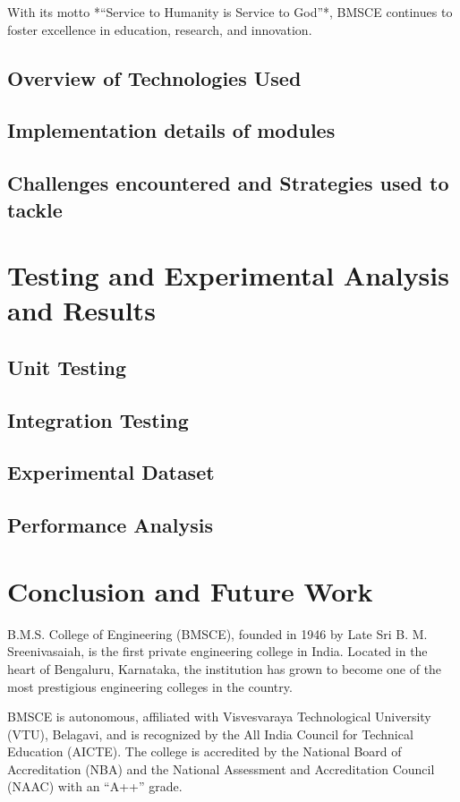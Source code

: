 \documentclass[12pt,a4paper]{report}
\begin{document}
With its motto *“Service to Humanity is Service to God”*, BMSCE continues to foster 
excellence in education, research, and innovation.
\section{Overview of Technologies Used}
\section{Implementation details of modules}
\section{Challenges encountered and Strategies used to tackle}
\chapter{Testing and Experimental Analysis and Results}
\section{ Unit Testing}
\section{Integration Testing}
\section{Experimental Dataset}
\section{Performance Analysis}
	

\chapter{Conclusion and Future Work}
B.M.S. College of Engineering (BMSCE), founded in 1946 by Late Sri B. M. Sreenivasaiah, 
is the first private engineering college in India. Located in the heart of Bengaluru, 
Karnataka, the institution has grown to become one of the most prestigious engineering 
colleges in the country. 

BMSCE is autonomous, affiliated with Visvesvaraya Technological University (VTU), Belagavi, 
and is recognized by the All India Council for Technical Education (AICTE). The college is 
accredited by the National Board of Accreditation (NBA) and the National Assessment and 
Accreditation Council (NAAC) with an “A++” grade.
\end{document}
